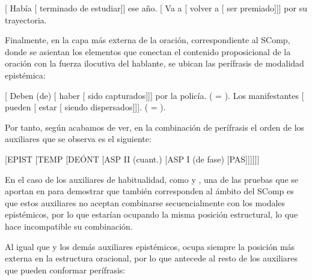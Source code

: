\begin{exe}
  \ex {}[ Había [ terminado de estudiar]] ese año.
  \ex {}[ Va a [ volver a [ ser premiado]]] por su
      trayectoria.
\end{exe}

Finalmente, en la capa más externa de la oración, correspondiente al SComp,
donde se asientan los elementos que conectan el contenido proposicional de la
oración con la fuerza ilocutiva del hablante, se ubican las perífrasis de
modalidad epistémica:

\begin{exe}
  \ex {}[ Deben (de) [ haber [ sido capturados]]]
      por la policía. ( = ).
  \ex Los manifestantes [ pueden [ estar [ siendo
      dispersados]]]. ( = ).
\end{exe}

Por tanto, según acabamos de ver, en la combinación de perífrasis el orden de los
auxiliares que se observa es el siguiente:

\begin{center}
[EPIST [TEMP [DEÓNT [ASP II (cuant.) [ASP I (de fase) [PAS]]]]]]
\end{center}

En el caso de los auxiliares de habitualidad, como  y
, una de las pruebas que se aportan en
\textcite{giammatteo2009marcovecchio,giammatteo2010marcovecchio} para demostrar
que también corresponden al ámbito del SComp es que estos auxiliares no aceptan
combinarse secuencialmente con los modales epistémicos, por lo que estarían
ocupando la misma posición estructural, lo que hace incompatible su
combinación.

\begin{exe}
  \ex
    \begin{xlist}
    \end{xlist}
\end{exe}

Al igual que  y los demás auxiliares epistémicos, 
ocupa siempre la posición más externa en la estructura oracional, por lo que
antecede al resto de los auxiliares que pueden conformar perífrasis:

